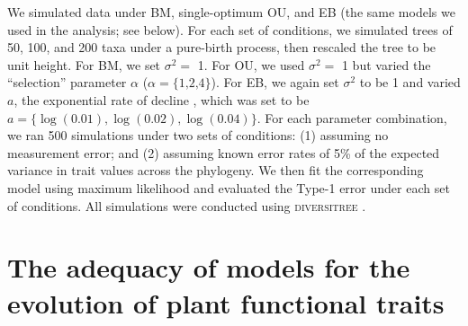We simulated data under BM, single-optimum OU, and EB (the same models we used in the analysis; see below). For each set of conditions, we simulated trees of 50, 100, and 200 taxa under a pure-birth process, then rescaled the tree to be unit height. For BM, we set $\sigma^2=$ 1. For OU, we used $\sigma^2=$ 1 but varied the ``selection'' parameter $\alpha$ ($\alpha=\lbrace \text{1,2,4} \rbrace$). For EB, we again set $\sigma^2$ to be 1 and varied $a$, the exponential rate of decline \citep[see][for details]{Harmon2010, SlaterPennell}, which was set to be $a=\lbrace \log(\text{0.01}), \log(\text{0.02}), \log(\text{0.04}) \rbrace$. For each parameter combination, we ran 500 simulations under two sets of conditions: (1) assuming no measurement error; and (2) assuming known error rates of 5\% of the expected variance in trait values across the phylogeny. We then fit the corresponding model using maximum likelihood and evaluated the Type-1 error under each set of conditions. All simulations were conducted using \textsc{diversitree} \citep{FitzJohn2012}.


\section{The adequacy of models for the evolution of plant functional traits}

